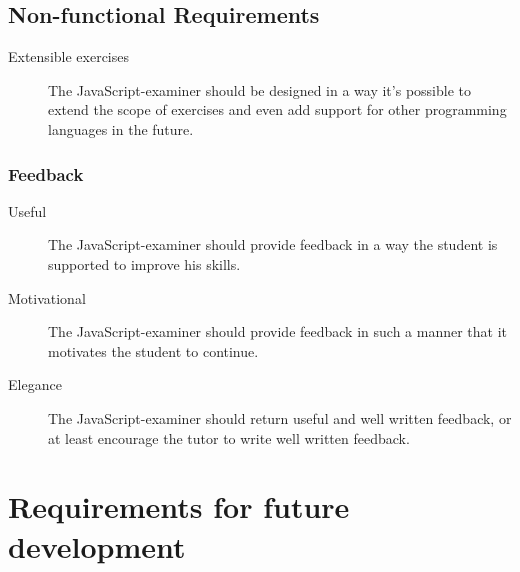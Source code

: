 \subsection{Non-functional Requirements}
\begin{description}
  \item[Extensible exercises] The JavaScript-examiner should be designed in a
    way it's possible to extend the scope of exercises and even add support for
    other programming languages in the future. 
\end{description}

\subsubsection{Feedback}
\begin{description}
  \item[Useful] The JavaScript-examiner should provide feedback in a way
    the student is supported to improve his skills.
  \item[Motivational] The JavaScript-examiner should provide feedback in such a
    manner that it motivates the student to continue.
  \item[Elegance] The JavaScript-examiner should return useful and well written 
    feedback, or at least encourage the tutor to write well written feedback.
\end{description}

\section{Requirements for future development}
